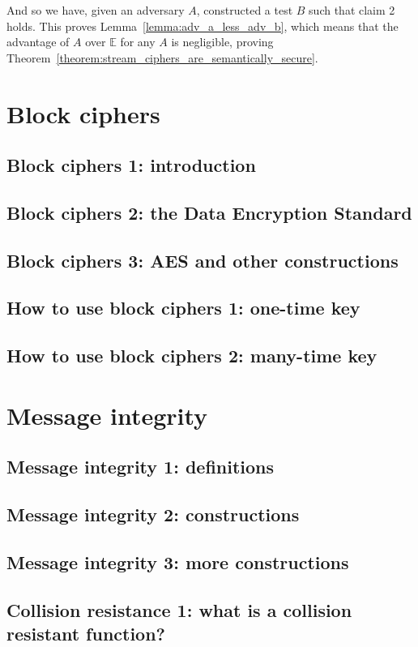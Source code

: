 \documentclass[10pt,a4paper]{report}
\begin{document}
And so we have, given an adversary $A$, constructed a test $B$ such that claim 2 holds. This
proves Lemma~\ref{lemma:adv_a_less_adv_b}, which means that the advantage of $A$ over $\mathbb{E}$
for any $A$ is negligible, proving Theorem~\ref{theorem:stream_ciphers_are_semantically_secure}.

\chapter{Block ciphers}

\section{Block ciphers 1: introduction}
\section{Block ciphers 2: the Data Encryption Standard}
\section{Block ciphers 3: AES and other constructions}
\section{How to use block ciphers 1: one-time key}
\section{How to use block ciphers 2: many-time key}

\chapter{Message integrity}

\section{Message integrity 1: definitions}
\section{Message integrity 2: constructions}
\section{Message integrity 3: more constructions}
\section{Collision resistance 1: what is a collision resistant function?}
\end{document}
